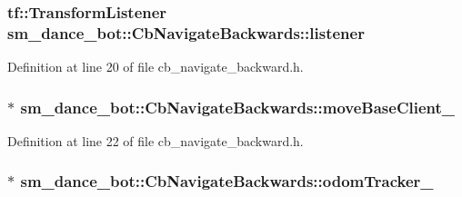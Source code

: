 \subsubsection[{\texorpdfstring{listener}{listener}}]{\setlength{\rightskip}{0pt plus 5cm}tf\+::\+Transform\+Listener sm\+\_\+dance\+\_\+bot\+::\+Cb\+Navigate\+Backwards\+::listener}\hypertarget{classsm__dance__bot_1_1CbNavigateBackwards_a4ec9af0d5b94c5e0654a768c36bec85b}{}\label{classsm__dance__bot_1_1CbNavigateBackwards_a4ec9af0d5b94c5e0654a768c36bec85b}


Definition at line 20 of file cb\+\_\+navigate\+\_\+backward.\+h.

\subsubsection[{\texorpdfstring{move\+Base\+Client\+\_\+}{moveBaseClient_}}]{ $\ast$ sm\+\_\+dance\+\_\+bot\+::\+Cb\+Navigate\+Backwards\+::move\+Base\+Client\+\_\+}\hypertarget{classsm__dance__bot_1_1CbNavigateBackwards_ae4cd503172b4f5c7b0dba49aec08885e}{}\label{classsm__dance__bot_1_1CbNavigateBackwards_ae4cd503172b4f5c7b0dba49aec08885e}


Definition at line 22 of file cb\+\_\+navigate\+\_\+backward.\+h.

\subsubsection[{\texorpdfstring{odom\+Tracker\+\_\+}{odomTracker_}}]{$\ast$ sm\+\_\+dance\+\_\+bot\+::\+Cb\+Navigate\+Backwards\+::odom\+Tracker\+\_\+}\hypertarget{classsm__dance__bot_1_1CbNavigateBackwards_a5361e3e58c18fc428c00bc50977ee715}{}\label{classsm__dance__bot_1_1CbNavigateBackwards_a5361e3e58c18fc428c00bc50977ee715}


